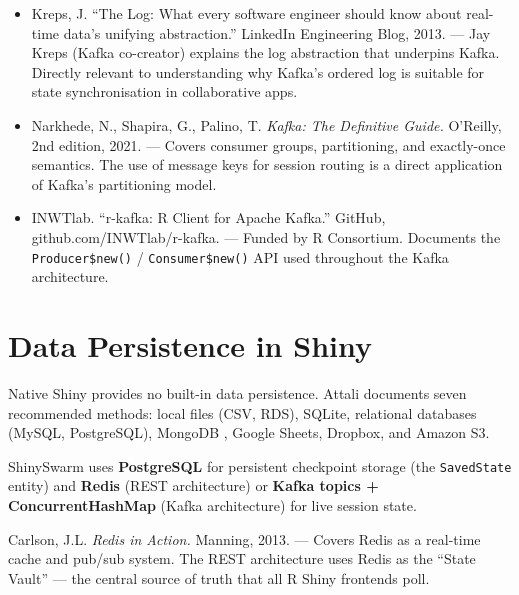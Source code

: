 \documentclass[12pt,a4paper]{article}
\begin{document}
\begin{addedsource}
\begin{itemize}[nosep]
  \item Kreps, J. ``The Log: What every software engineer should know about real-time data's unifying abstraction.'' LinkedIn Engineering Blog, 2013. --- Jay Kreps (Kafka co-creator) explains the log abstraction that underpins Kafka. Directly relevant to understanding why Kafka's ordered log is suitable for state synchronisation in collaborative apps.
  \item Narkhede, N., Shapira, G., Palino, T. \textit{Kafka: The Definitive Guide.} O'Reilly, 2nd edition, 2021. --- Covers consumer groups, partitioning, and exactly-once semantics. The use of message keys for session routing is a direct application of Kafka's partitioning model.
  \item INWTlab. ``r-kafka: R Client for Apache Kafka.'' GitHub, github.com/INWTlab/r-kafka. --- Funded by R Consortium. Documents the \texttt{Producer\$new()} / \texttt{Consumer\$new()} API used throughout the Kafka architecture.
\end{itemize}
\end{addedsource}

\section{Data Persistence in Shiny}

Native Shiny provides no built-in data persistence. Attali \cite{attali2016} documents seven recommended methods: local files (CSV, RDS), SQLite, relational databases (MySQL, PostgreSQL), MongoDB \cite{mongodb}, Google Sheets, Dropbox, and Amazon S3.

ShinySwarm uses \textbf{PostgreSQL} for persistent checkpoint storage (the \texttt{SavedState} entity) and \textbf{Redis} (REST architecture) or \textbf{Kafka topics + ConcurrentHashMap} (Kafka architecture) for live session state.

\begin{addedsource}
Carlson, J.L. \textit{Redis in Action.} Manning, 2013. --- Covers Redis as a real-time cache and pub/sub system. The REST architecture uses Redis as the ``State Vault'' --- the central source of truth that all R Shiny frontends poll.
\end{addedsource}

\end{document}
